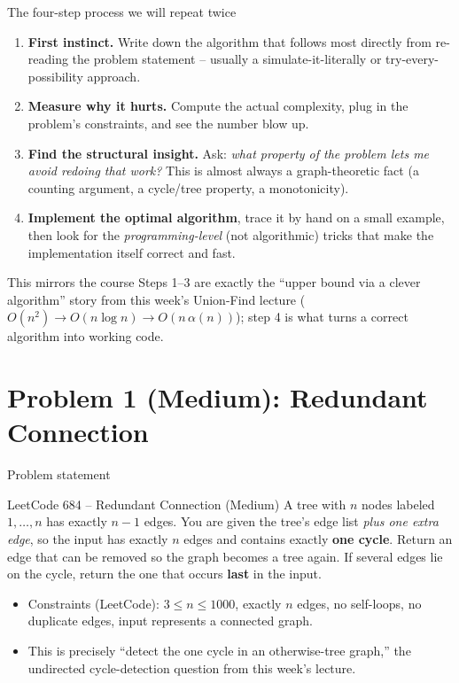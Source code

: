 \documentclass[11pt,aspectratio=169]{beamer}
\begin{document}
\begin{frame}{The four-step process we will repeat twice}
  \begin{enumerate}
    \item \textbf{First instinct.} Write down the algorithm that follows most directly
    from re-reading the problem statement -- usually a simulate-it-literally or
    try-every-possibility approach.
    \item \textbf{Measure why it hurts.} Compute the actual complexity, plug in the
    problem's constraints, and see the number blow up.
    \item \textbf{Find the structural insight.} Ask: \emph{what property of the problem
    lets me avoid redoing that work?} This is almost always a graph-theoretic fact
    (a counting argument, a cycle/tree property, a monotonicity).
    \item \textbf{Implement the optimal algorithm}, trace it by hand on a small example,
    then look for the \emph{programming-level} (not algorithmic) tricks that make the
    implementation itself correct and fast.
  \end{enumerate}
  \begin{alertblock}{This mirrors the course}
    Steps 1--3 are exactly the ``upper bound via a clever algorithm'' story from this
    week's Union-Find lecture ($O(n^2) \to O(n \log n) \to O(n\,\alpha(n))$); step 4 is
    what turns a correct algorithm into working code.
  \end{alertblock}
\end{frame}

\section{Problem 1 (Medium): Redundant Connection}

\begin{frame}{Problem statement}
  \begin{block}{LeetCode 684 -- Redundant Connection (\textcolor{blue!50!black}{Medium})}
    A tree with $n$ nodes labeled $1, \dots, n$ has exactly $n-1$ edges. You are given
    the tree's edge list \emph{plus one extra edge}, so the input has exactly $n$ edges
    and contains exactly \textbf{one cycle}. Return an edge that can be removed so the
    graph becomes a tree again. If several edges lie on the cycle, return the one that
    occurs \textbf{last} in the input.
  \end{block}
  \begin{itemize}
    \item Constraints (LeetCode): $3 \le n \le 1000$, exactly $n$ edges, no self-loops,
    no duplicate edges, input represents a connected graph.
    \item This is precisely ``detect the one cycle in an otherwise-tree graph,'' the
    undirected cycle-detection question from this week's lecture.
  \end{itemize}
\end{frame}
\end{document}
